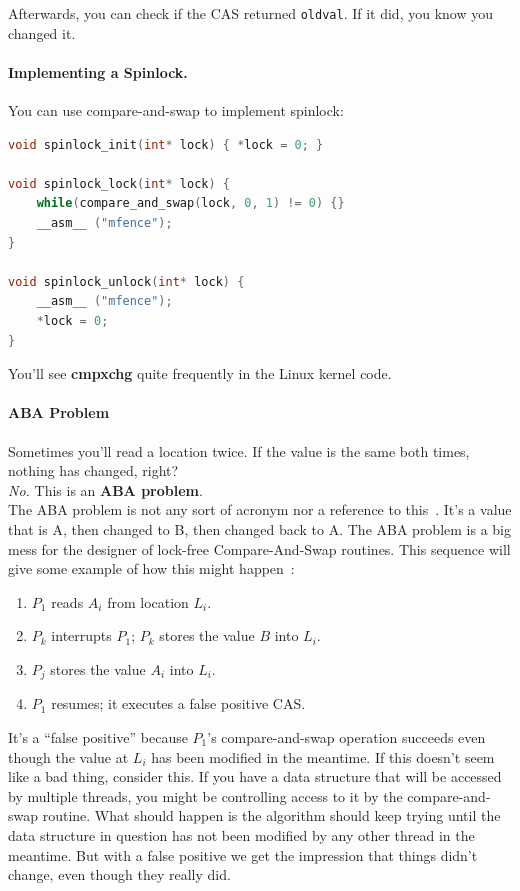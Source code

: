 \documentclass[a4paper]{report}
\begin{document}
Afterwards, you can check if the CAS returned {\tt oldval}. If it did, you know you changed it.


\paragraph{Implementing a Spinlock.}
You can use compare-and-swap to implement spinlock:
  \begin{lstlisting}[language=C]
void spinlock_init(int* lock) { *lock = 0; }

void spinlock_lock(int* lock) {
    while(compare_and_swap(lock, 0, 1) != 0) {}
    __asm__ ("mfence");
}

void spinlock_unlock(int* lock) {
    __asm__ ("mfence");
    *lock = 0;  
}
  \end{lstlisting}
You'll see {\bf cmpxchg} quite frequently in the Linux kernel code.

\paragraph{ABA Problem}
Sometimes you'll read a location twice.
If the value is the same both times, nothing has changed, right?\\[1em]

\emph{No.} This is an {\bf ABA problem}.\\[1em]

The ABA problem is not any sort of acronym nor a reference to this~\cite{abba}. It's a value that is A, then changed to B, then changed back to A. The ABA problem is a big mess for the designer of lock-free Compare-And-Swap routines. This sequence will give some example of how this might happen~\cite{abaproblem}:

\begin{enumerate}
	\item $P_{1}$ reads $A_{i}$ from location $L_{i}$.
	\item $P_{k}$ interrupts $P_{1}$; $P_{k}$ stores the value $B$ into $L_{i}$.
	\item $P_{j}$ stores the value $A_{i}$ into $L_{i}$.
	\item $P_{1}$ resumes; it executes a false positive CAS.
\end{enumerate} 

It's a ``false positive'' because $P_{1}$'s compare-and-swap operation succeeds even though the value at $L_{i}$ has been modified in the meantime. If this doesn't seem like a bad thing, consider this. If you have a data structure that will be accessed by multiple threads, you might be controlling access to it by the compare-and-swap routine. What should happen is the algorithm should keep trying until the data structure in question has not been modified by any other thread in the meantime. But with a false positive we get the impression that things didn't change, even though they really did.
\end{document}
